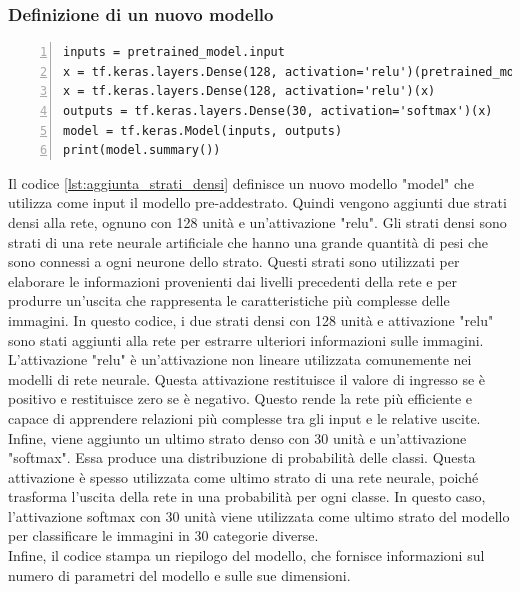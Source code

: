 \documentclass[a4paper,final,12pt]{report}
\begin{document}
\subsubsection{Definizione di un nuovo modello}
\begin{lstlisting}[caption={Aggiunta di due strati densi alla rete.}, label={lst:aggiunta_strati_densi}, breaklines, escapechar=`\%, frame=lines, basicstyle=\small\ttfamily, keepspaces=true, numbers=left]
inputs = pretrained_model.input
x = tf.keras.layers.Dense(128, activation='relu')(pretrained_model.output)
x = tf.keras.layers.Dense(128, activation='relu')(x)
outputs = tf.keras.layers.Dense(30, activation='softmax')(x)
model = tf.keras.Model(inputs, outputs)
print(model.summary())
\end{lstlisting}
Il codice \ref{lst:aggiunta_strati_densi} definisce un nuovo modello "model" che utilizza come input il modello pre-addestrato. Quindi vengono aggiunti due strati densi alla rete, ognuno con 128 unità e un'attivazione "relu". Gli strati densi sono strati di una rete neurale artificiale che hanno una grande quantità di pesi che sono connessi a ogni neurone dello strato. Questi strati sono utilizzati per elaborare le informazioni provenienti dai livelli precedenti della rete e per produrre un'uscita che rappresenta le caratteristiche più complesse delle immagini. In questo codice, i due strati densi con 128 unità e attivazione "relu" sono stati aggiunti alla rete per estrarre ulteriori informazioni sulle immagini. L'attivazione "relu" è un'attivazione non lineare utilizzata comunemente nei modelli di rete neurale. Questa attivazione restituisce il valore di ingresso se è positivo e restituisce zero se è negativo. Questo rende la rete più efficiente e capace di apprendere relazioni più complesse tra gli input e le relative uscite.\\
Infine, viene aggiunto un ultimo strato denso con 30 unità e un'attivazione "softmax". Essa produce una distribuzione di probabilità delle classi. Questa attivazione è spesso utilizzata come ultimo strato di una rete neurale, poiché trasforma l'uscita della rete in una probabilità per ogni classe. In questo caso, l'attivazione softmax con 30 unità viene utilizzata come ultimo strato del modello per classificare le immagini in 30 categorie diverse.\\
Infine, il codice stampa un riepilogo del modello, che fornisce informazioni sul numero di parametri del modello e sulle sue dimensioni.\\
\end{document}
